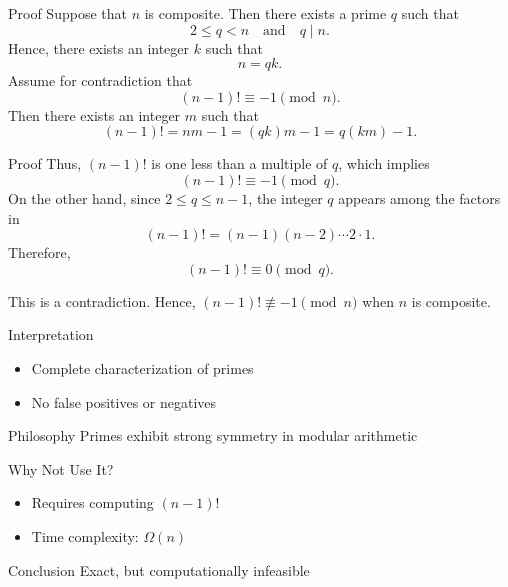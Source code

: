 \documentclass{beamer}
\begin{document}
\begin{frame}{Proof}
Suppose that $n$ is composite. Then there exists a prime $q$ such that
\[
2 \leq q < n \quad \text{and} \quad q \mid n.
\]
Hence, there exists an integer $k$ such that
\[
n = qk.
\]
\pause
Assume for contradiction that
\[
(n-1)! \equiv -1 \pmod{n}.
\]
Then there exists an integer $m$ such that
\[
(n-1)! = nm - 1 = (qk)m - 1 = q(km) - 1.
\]

\end{frame}

\begin{frame}{Proof}
Thus, $(n-1)!$ is one less than a multiple of $q$, which implies
\[
(n-1)! \equiv -1 \pmod{q}.
\]
\pause
On the other hand, since $2 \leq q \leq n-1$, the integer $q$ appears among the factors in
\[
(n-1)! = (n-1)(n-2)\cdots 2 \cdot 1.
\]
Therefore,
\[
(n-1)! \equiv 0 \pmod{q}.
\]

This is a contradiction. Hence,
$
(n-1)! \not\equiv -1 \pmod{n}
$
when $n$ is composite.
    

\end{frame}


\begin{frame}{Interpretation}

\begin{itemize}
    \item Complete characterization of primes

    \item No false positives or negatives
\end{itemize}


\begin{block}{Philosophy}
Primes exhibit strong symmetry in modular arithmetic
\end{block}

\end{frame}


\begin{frame}{Why Not Use It?}

\begin{itemize}
    \item Requires computing $(n-1)!$

    \item Time complexity: $\Omega(n)$
\end{itemize}


\begin{block}{Conclusion}
Exact, but computationally infeasible
\end{block}

\end{frame}
\end{document}
